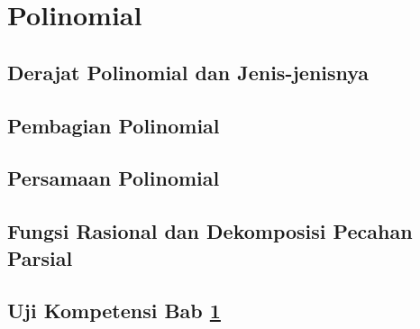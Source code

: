 \chapter{Polinomial}
\label{sec:sixth}

\kant[1-5]

\section{Derajat Polinomial dan Jenis-jenisnya}
\kant[6-10]

\section{Pembagian Polinomial}
\kant[11-15]

\section{Persamaan Polinomial}
\kant[16-20]

\section{Fungsi Rasional dan Dekomposisi Pecahan Parsial}
\kant[21-25]

\section{Uji Kompetensi Bab \ref{sec:sixth}}
\kant[26]

